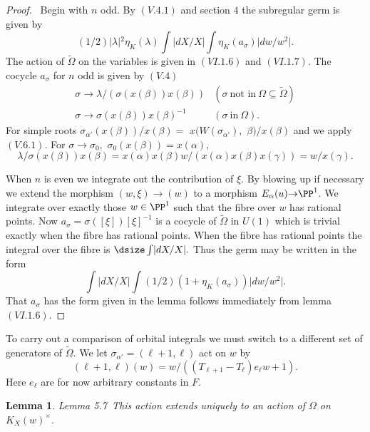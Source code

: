 \documentclass{memo-l}
\newtheorem{lemma}[theorem]{Lemma}
\theoremstyle{definition}
\theoremstyle{remark}
\numberwithin{section}{chapter}
\numberwithin{equation}{chapter}
\begin{document}
\begin{proof} \ Begin with $n$ odd.  By $(V.4.1)$ and section $4$ the
subregular germ is given by
$$
(1/2)\vert {\lambda}\vert {}^{2}{\eta}_{K}({\lambda}) \int\vert dX/X\vert
\int{\eta}_{K}(a_{{\sigma}})\vert dw/w^{2}\vert .
$$
The action of $\tilde{\Omega} $ on the variables is given in $(VI.1.6)$ and
$(VI.1.7)$.  The cocycle ${a}_{{\sigma}}$ for $n$ odd is given by
$(V.4)$
$$
\begin{matrix} 
{\sigma} {\to} {\lambda}/({\sigma}(x({\beta}))x({\beta})) & 
({\sigma}\ {\text{not\ in}}\ {\Omega} {\subseteq} \tilde{\Omega})\\
{\sigma} {\to} {\sigma}(x({\beta}))x({\beta})^{-1} & ({\sigma}\ {\text{in}}\ 
{\Omega}).
\end{matrix}
$$
For simple roots ${\sigma}_{{\alpha}'}(x({\beta}))/x({\beta})  =$ 
$x(W({\sigma}_{{\alpha}'}),$  ${\beta})/x({\beta})$ and we apply $(V.6.1)$.  For
${\sigma} {\to} {\sigma}_{0},$ ${\sigma}_{0}(x({\beta}))  =  x({\alpha}),$
$${\lambda}/{\sigma}(x({\beta}))x({\beta})  =
x({\alpha})x({\beta})w/(x({\alpha})x({\beta})x({\gamma}))  =
w/x({\gamma}).$$


   When $n$ is even we integrate out the contribution of ${\xi}$.  By
blowing up if necessary we extend the morphism $(w,{\xi}) {\to} (w)$ to a
morphism $E_{{\alpha}}(u) {\to} {\PP}^{1}$.  We integrate over exactly
those $w  \in  {\PP}^{1}$ such that the fibre over $w$ has rational
points.  Now $a_{{\sigma}}  =  {\sigma}([{\xi}])[{\xi}]^{-1}$ is a cocycle of
$\tilde {\Omega } $ in $U(1)$ which is trivial exactly when the fibre has
rational points.  When the fibre has rational points the integral over the
fibre is ${\dsize\int}\vert dX/X\vert .$ Thus the germ may be written in the form
$$
\int\vert dX/X\vert \int (1/2)(1+{\eta}_{K}(a_{{\sigma}}))\vert
dw/w^{2}\vert.
$$
That $a_{{\sigma}}$ has the form given in the lemma follows immediately
from lemma $(VI.1.6)$.
\end{proof} 

{\medskip}

   To carry out a comparison of orbital integrals we must switch to a
different set of generators of $\tilde {\Omega } .$ We let
${\sigma}_{{\alpha}'} = ({\ell}+1,{\ell})$ act on $w$ by
$$
({\ell}+1,{\ell})(w)  =  w/((T_{{\ell}+1}-T_{{\ell}})e_{{\ell}}w + 1).
$$
Here $e_\ell$ are for now arbitrary constants in $F$.

\medpagebreak

\begin{lemma}{Lemma 5.7}\ This action extends uniquely to an action of
${\Omega}$ on $K_X(w)^{\times}$.
\end{lemma}
\end{document}
